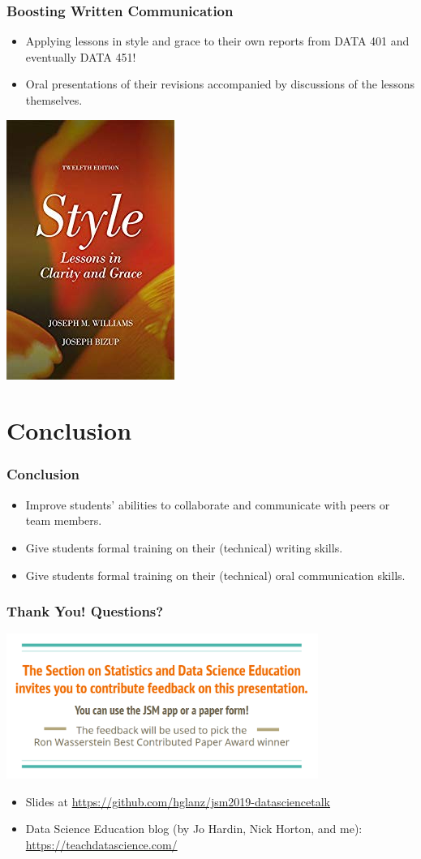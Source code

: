 \documentclass[xcolor={dvipsnames}]{beamer}
\newcommand{\ft}{\frametitle}
\newcommand{\bi}{\begin{itemize}}
\newcommand{\ei}{\end{itemize}}
\begin{document}
\begin{frame}
\ft{Boosting Written Communication}
\bi
	\item Applying lessons in style and grace to their own reports from DATA 401 and eventually DATA 451!
	\pause
	\item Oral presentations of their revisions accompanied by discussions of the lessons themselves.
\ei
\begin{center}
	\includegraphics[width = .25\textwidth]{styleandgrace_book.jpg}
\end{center}
\end{frame}

\section{Conclusion}

\begin{frame}
\ft{Conclusion}
\bi
	\item Improve students' abilities to collaborate and communicate with peers or team members.
	\pause
	\item Give students formal training on their (technical) writing skills.
	\pause
	\item Give students formal training on their (technical) oral communication skills.
\ei
\end{frame}

\begin{frame}
\frametitle{Thank You! Questions?}
\begin{center}
	\includegraphics[width = 4in]{lastslide_survey.png}
\end{center}
\bi
	\item Slides at \href{https://github.com/hglanz/jsm2019-datasciencetalk}{https://github.com/hglanz/jsm2019-datasciencetalk}
	\item Data Science Education blog (by Jo Hardin, Nick Horton, and me): \href{https://teachdatascience.com/}{https://teachdatascience.com/}
\ei
\end{frame}
\end{document}
